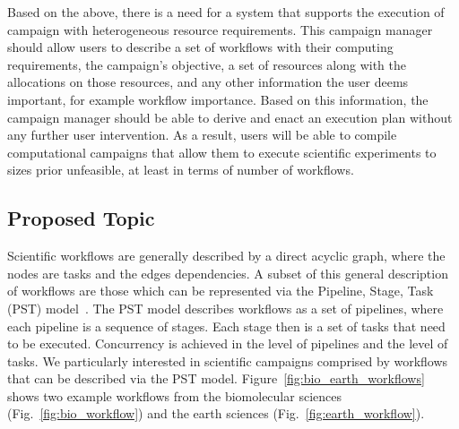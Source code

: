 Based on the above, there is a need for a system that supports the execution of campaign with heterogeneous resource requirements.
This campaign manager should allow users to describe a set of workflows with their computing requirements, the campaign's objective, a set of resources along with the allocations on those resources, and any other information the user deems important, for example workflow importance.
Based on this information, the campaign manager should be able to derive and enact an execution plan without any further user intervention.
As a result, users will be able to compile computational campaigns that allow them to execute scientific experiments to sizes prior unfeasible, at least in terms of number of workflows.


\subsection{Proposed Topic}

Scientific workflows are generally described by a direct acyclic graph, where the nodes are tasks and the edges dependencies.
A subset of this general description of workflows are those which can be represented via the Pipeline, Stage, Task (PST) model~\cite{balasubramanian2018harnessing}.
The PST model describes workflows as a set of pipelines, where each pipeline is a sequence of stages.
Each stage then is a set of tasks that need to be executed.
Concurrency is achieved in the level of pipelines and the level of tasks. 
We particularly interested in scientific campaigns comprised by workflows that can be described via the PST model.
Figure~\ref{fig:bio_earth_workflows} shows two example workflows from the biomolecular sciences (Fig.~\ref{fig:bio_workflow}) and the earth sciences (Fig.~\ref{fig:earth_workflow}). 

